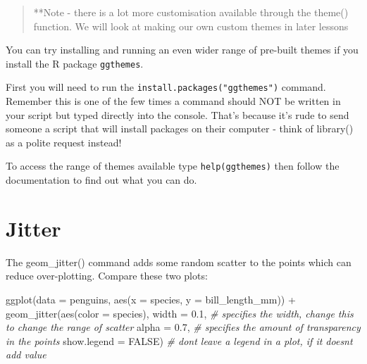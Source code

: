 \documentclass[
]{book}
\makeatletter
\newenvironment{Shaded}{\begin{snugshade}}{\end{snugshade}}
\newcommand{\AttributeTok}[1]{\textcolor[rgb]{0.77,0.63,0.00}{#1}}
\newcommand{\CommentTok}[1]{\textcolor[rgb]{0.56,0.35,0.01}{\textit{#1}}}
\newcommand{\ConstantTok}[1]{\textcolor[rgb]{0.00,0.00,0.00}{#1}}
\newcommand{\FloatTok}[1]{\textcolor[rgb]{0.00,0.00,0.81}{#1}}
\newcommand{\FunctionTok}[1]{\textcolor[rgb]{0.00,0.00,0.00}{#1}}
\newcommand{\NormalTok}[1]{#1}
\newcommand{\SpecialCharTok}[1]{\textcolor[rgb]{0.00,0.00,0.00}{#1}}
\newenvironment{kframe}{%
\medskip{}
\setlength{\fboxsep}{.8em}
 \def\at@end@of@kframe{}%
 \ifinner\ifhmode%
  \def\at@end@of@kframe{\end{minipage}}%
  \begin{minipage}{\columnwidth}%
 \fi\fi%
 \def\FrameCommand##1{\hskip\@totalleftmargin \hskip-\fboxsep
 \colorbox{shadecolor}{##1}\hskip-\fboxsep
     \hskip-\linewidth \hskip-\@totalleftmargin \hskip\columnwidth}%
 \MakeFramed {\advance\hsize-\width
   \@totalleftmargin\z@ \linewidth\hsize
   \@setminipage}}%
 {\par\unskip\endMakeFramed%
 \at@end@of@kframe}
\newenvironment{block}[1]
  {
  \begin{itemize}
  \renewcommand{\labelitemi}{
    \raisebox{-.7\height}[0pt][0pt]{
      {\setkeys{Gin}{width=3em,keepaspectratio}\texttt{[image: images/\#1]}}
    }
  }
  \setlength{\fboxsep}{1em}
  \begin{kframe}
  \item
  }
  {
  \end{kframe}
  \end{itemize}
  }
\newenvironment{rmdwarning}
  {\begin{block}{warning}}
  {\end{block}}
\makeatother
\begin{document}
\begin{quote}
**Note - there is a lot more customisation available through the theme() function. We will look at making our own custom themes in later lessons
\end{quote}

\begin{rmdwarning}
You can try installing and running an even wider range of pre-built
themes if you install the R package \texttt{ggthemes}.

First you will need to run the \texttt{install.packages("ggthemes")}
command. Remember this is one of the few times a command should NOT be
written in your script but typed directly into the console. That's
because it's rude to send someone a script that will install packages on
their computer - think of library() as a polite request instead!

To access the range of themes available type \texttt{help(ggthemes)}
then follow the documentation to find out what you can do.
\end{rmdwarning}

\hypertarget{jitter}{%
\section{Jitter}\label{jitter}}

The geom\_jitter() command adds some random scatter to the points which can reduce over-plotting. Compare these two plots:

\begin{Shaded}
\begin{Highlighting}[]
\FunctionTok{ggplot}\NormalTok{(}\AttributeTok{data =}\NormalTok{ penguins, }\FunctionTok{aes}\NormalTok{(}\AttributeTok{x =}\NormalTok{ species, }\AttributeTok{y =}\NormalTok{ bill\_length\_mm)) }\SpecialCharTok{+}
  \FunctionTok{geom\_jitter}\NormalTok{(}\FunctionTok{aes}\NormalTok{(}\AttributeTok{color =}\NormalTok{ species),}
              \AttributeTok{width =} \FloatTok{0.1}\NormalTok{, }\CommentTok{\# specifies the width, change this to change the range of scatter}
              \AttributeTok{alpha =} \FloatTok{0.7}\NormalTok{, }\CommentTok{\# specifies the amount of transparency in the points}
              \AttributeTok{show.legend =} \ConstantTok{FALSE}\NormalTok{) }\CommentTok{\# don\textquotesingle{}t leave a legend in a plot, if it doesn\textquotesingle{}t add value}
\end{Highlighting}
\end{Shaded}
\end{document}
